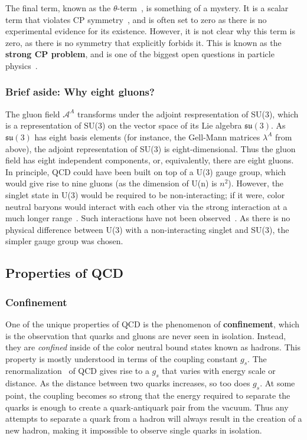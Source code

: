 The final term, known as the $\theta$-term~\cite{ThetaTerm}, is something of a mystery. It is a scalar term that violates CP symmetry~\cite{CPSymmetry}, and is often set to zero as there is no experimental evidence for its existence. However, it is not clear why this term is zero, as there is no symmetry that explicitly forbids it. This is known as the \textbf{strong CP problem}, and is one of the biggest open questions in particle physics~\cite{StrongCPProblem}. 


\subsubsection{Brief aside: Why eight gluons?}
\label{sec:why_eight_gluons}

The gluon field $\mathcal{A}^A$ transforms under the adjoint respresentation of SU(3), which is a representation of SU(3) on the vector space of its Lie algebra $\mathfrak{su}(3)$. As $\mathfrak{su}(3)$ has eight basis elements (for instance, the Gell-Mann matrices $\lambda^A$ from above), the adjoint representation of SU(3) is eight-dimensional. Thus the gluon field has eight independent components, or, equivalently, there are eight gluons. In principle, QCD could have been built on top of a U(3) gauge group, which would give rise to nine gluons (as the dimension of U(n) is $n^2$). However, the singlet state in U(3) would be required to be non-interacting; if it were, color neutral baryons would interact with each other via the strong interaction at a much longer range~\cite{SingletGluons}. Such interactions have not been observed~\cite{SingletGluons2}. As there is no physical difference between U(3) with a non-interacting singlet and SU(3), the simpler gauge group was chosen. 


\subsection{Properties of QCD}
\label{sec:qcd_features}

\subsubsection{Confinement}
\label{sec:qcd_confinement}

One of the unique properties of QCD is the phenomenon of \textbf{confinement}, which is the observation that quarks and gluons are never seen in isolation. Instead, they are \textit{confined} inside of the color neutral bound states known as hadrons. This property is mostly understood in terms of the coupling constant $g_{s}$. The renormalization~\cite{QCDRenorm} of QCD gives rise to a $g_{s}$ that varies with energy scale or distance. As the distance between two quarks increases, so too does $g_{s}$. At some point, the coupling becomes so strong that the energy required to separate the quarks is enough to create a quark-antiquark pair from the vacuum. Thus any attempts to separate a quark from a hadron will always result in the creation of a new hadron, making it impossible to observe single quarks in isolation. 

